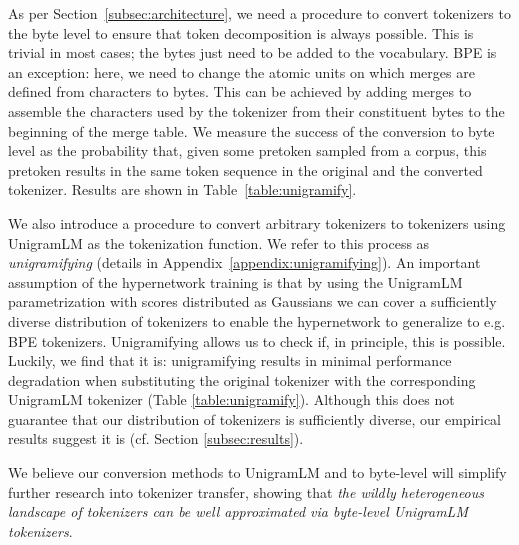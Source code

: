 \documentclass{article}
\begin{document}




As per Section~\ref{subsec:architecture}, we need a procedure to convert tokenizers to the byte level to ensure that token decomposition is always possible. This is trivial in most cases; the bytes just need to be added to the vocabulary. BPE is an exception: here, we need to change the atomic units on which merges are defined from characters to bytes. This can be achieved by adding merges to assemble the characters used by the tokenizer from their constituent bytes to the beginning of the merge table. We measure the success of the conversion to byte level as the probability that, given some pretoken sampled from a corpus, this pretoken results in the same token sequence in the original and the converted tokenizer. Results are shown in Table~\ref{table:unigramify}.

 We also introduce a procedure to convert arbitrary tokenizers to tokenizers using UnigramLM as the tokenization function. We refer to this process as \textit{unigramifying} (details in Appendix~\ref{appendix:unigramifying}). An important assumption of the hypernetwork training is that by using the UnigramLM parametrization with scores distributed as Gaussians we can cover a sufficiently diverse distribution of tokenizers to enable the hypernetwork to generalize to e.g. BPE tokenizers. Unigramifying allows us to check if, in principle, this is possible. Luckily, we find that it is: unigramifying results in minimal performance degradation when substituting the original tokenizer 
with the corresponding UnigramLM tokenizer (Table \ref{table:unigramify}). Although this does not guarantee that our distribution of tokenizers is sufficiently diverse, our empirical results suggest it is (cf. Section \ref{subsec:results}).

We believe our conversion methods to UnigramLM and to byte-level will simplify further research into tokenizer transfer, showing that \textit{the wildly heterogeneous landscape of tokenizers can be well approximated via byte-level UnigramLM tokenizers}.
\end{document}
